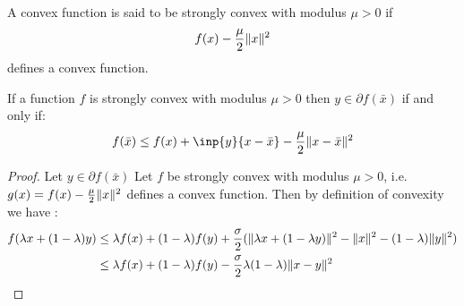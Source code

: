 \begin{definition}
        A convex function is said to be  strongly convex with modulus
	$\mu>0$ if 
        \begin{equation}
          f(x) - \frac{\mu}{2}\lVert x\rVert^2
        \end{equation}
        defines a convex function.\\
\end{definition}

\begin{lemma}
    If a function $f$ is strongly convex with modulus $\mu>0$  then 
  $y\in \partial f(\bar x)$ if and only if:
  \begin{equation}
    f(\bar x) \leq f(x) + \inp{y}{x-\bar x} - \frac{\mu}{2}\norm{x-\bar x}^2
  \end{equation}
  \begin{proof} 
      Let $y \in \partial f(\bar x)$
      Let $f$ be strongly convex with modulus $\mu>0$, i.e. $g(x) = f(x) -
      \frac{\mu}{2}\lVert x\rVert^2$ defines a convex function. Then by definition of convexity 
      we have :
      \begin{align}
	  f(\lambda x + (1-\lambda)y) &\leq \lambda f(x) + (1-\lambda)f(y) 
	  + \frac{\sigma}{2}(\norm{\lambda x + (1-\lambda y)}^2 - \norm{x}^2 -
	  (1-\lambda)\norm{y}^2)\\
%
	  &\leq \lambda f(x) + (1-\lambda)f(y) -
	  \frac{\sigma}{2}\lambda(1-\lambda)\norm{x-y}^2 
      \end{align}
\end{proof}
\end{lemma}








